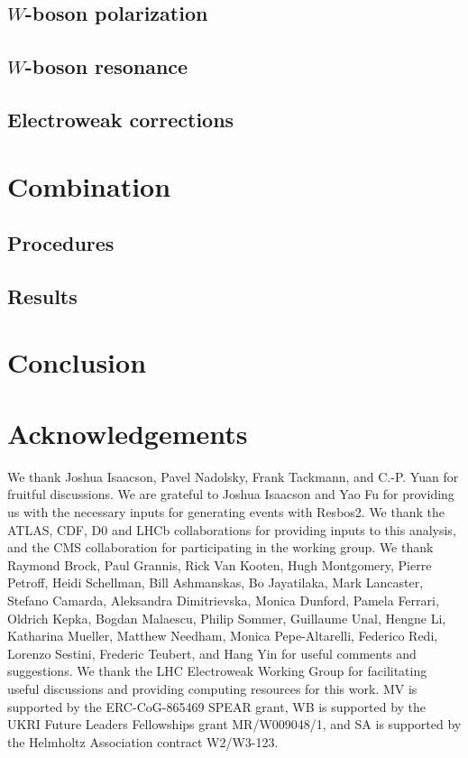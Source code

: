 \documentclass[epj]{svjour}
\begin{document}
\subsection{$W$-boson polarization}
\label{sec:polarization}


\subsection{$W$-boson resonance}
\label{sec:resonance}


\subsection{Electroweak corrections}
\label{sec:corrEWK}


\section{Combination}
\subsection{Procedures}
\label{sec:procedures}


\subsection{Results}
\label{sec:results}


\section{Conclusion}
\label{sec:conclusion}


\section*{Acknowledgements}
We thank Joshua Isaacson, Pavel Nadolsky, Frank Tackmann, and C.-P. Yuan for fruitful discussions.
We are grateful to Joshua Isaacson and Yao Fu for providing us with the necessary inputs for generating events
with Resbos2.
We thank the ATLAS, CDF, D0 and LHCb collaborations for providing inputs to this analysis, and the CMS collaboration
for participating in the working group.
We thank
Raymond Brock, Paul Grannis, Rick Van Kooten, Hugh Montgomery, Pierre Petroff, Heidi Schellman,
Bill Ashmanskas, Bo Jayatilaka, Mark Lancaster,
Stefano Camarda, Aleksandra Dimitrievska, Monica Dunford, Pamela Ferrari, Oldrich Kepka, Bogdan Malaescu, Philip Sommer,
Guillaume Unal,
Hengne Li, Katharina Mueller, Matthew Needham, Monica Pepe-Altarelli, Federico Redi, Lorenzo Sestini, Frederic Teubert, and
Hang Yin for useful comments and suggestions.
We thank the LHC Electroweak Working Group for facilitating useful discussions and providing computing
resources for this work.
MV is supported by the ERC-CoG-865469 SPEAR grant, WB is supported by the UKRI Future Leaders Fellowships grant MR/W009048/1,
and SA is supported by the Helmholtz Association contract W2/W3-123.
\end{document}
